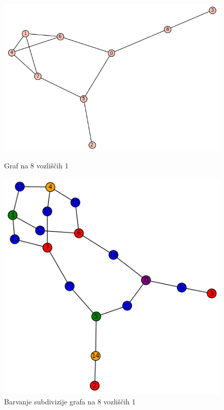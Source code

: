 \documentclass[11pt,a4paper,titlepage]{article}
\begin{document}
\begin{figure}[h]
\centering
\begin{minipage}{0.45\textwidth}
	\centering
	\includegraphics[width=\linewidth]{orig_8_1.png}
	\caption{Graf na 8 vozliščih 1}
\end{minipage}
\hfill
\begin{minipage}{0.45\textwidth}
	\centering
	\includegraphics[width=\linewidth]{sub_8_1.png}
	\caption{Barvanje subdivizije grafa na 8 vozliščih 1}
\end{minipage}
\end{figure}
\end{document}
